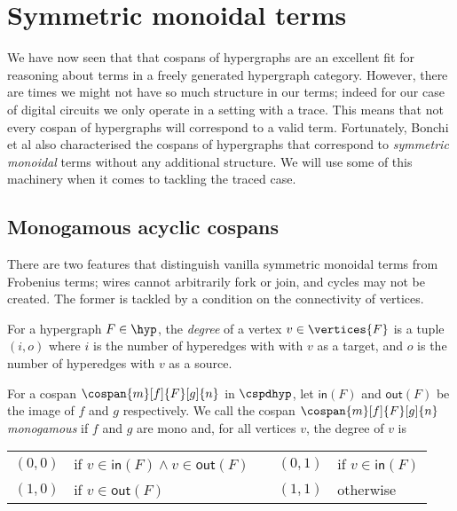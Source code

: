 \section{Symmetric monoidal terms}

We have now seen that that cospans of hypergraphs are an excellent fit for
reasoning about terms in a freely generated hypergraph category.
However, there are times we might not have so much structure in our terms;
indeed for our case of digital circuits we only operate in a setting with a
trace.
This means that not every cospan of hypergraphs will correspond to a valid term.
Fortunately, Bonchi et al also characterised the cospans of hypergraphs that
correspond to \emph{symmetric monoidal} terms without any additional structure.
We will use some of this machinery when it comes to tackling the traced case.

\subsection{Monogamous acyclic cospans}

There are two features that distinguish vanilla symmetric monoidal terms from
Frobenius terms; wires cannot arbitrarily fork or join, and cycles may not be
created.
The former is tackled by a condition on the connectivity of vertices.

\begin{definition}
    For a hypergraph \(F \in \hyp\), the \emph{degree} of a vertex
    \(v \in \vertices{F}\) is a tuple \((i,o)\) where \(i\) is the number of
    hyperedges with with \(v\) as a target, and \(o\) is the number of
    hyperedges with \(v\) as a source.
\end{definition}

\begin{definition}
    For a cospan \(\cospan{m}[f]{F}[g]{n}\) in
    \(\cspdhyp\), let \(\mathsf{in}(F)\) and \(\mathsf{out}(F)\) be the image of
    \(f\) and \(g\) respectively.
    We call the cospan \(\cospan{m}[f]{F}[g]{n}\) \emph{monogamous} if \(f\) and
    \(g\) are mono and, for all vertices \(v\), the degree of \(v\) is
    \begin{center}
        \begin{tabular}{rlcrl}
            \((0,0)\)
             &
            if \(v \in \mathsf{in}(F) \wedge v \in \mathsf{out}(F)\)
             &
            \quad
             &
            \((0,1)\)
             &
            if \(v \in \mathsf{in}(F)\)
            \\
            \((1,0)\)
             &
            if \(v \in \mathsf{out}(F)\)
             &
            \quad
             &
            \((1,1)\)
             &
            otherwise
        \end{tabular}
    \end{center}
\end{definition}

